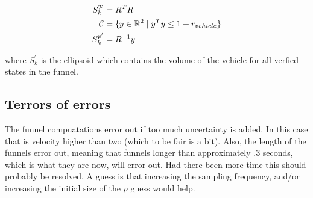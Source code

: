 \begin{align*}
  S_{k}^{\mathcal{P}} &= R^{T}R \\
  \mathcal{C} &= \lbrace y \in \mathbb{R}^2 \mid y^{T}y \leq 1 + r_{vehicle}\rbrace \\
  S_{k}^{p'} &= R^{-1}y \\
\end{align*}

where \(S_{k}^{'}\) is the ellipsoid which contains the volume of the vehicle
for all verfied states in the funnel.

\subsection{Terrors of errors}

The funnel compuatations error out if too much uncertainty is added. In this
case that is velocity higher than two (which to be fair is a bit). Also, the
length of the funnels error out, meaning that funnels longer than approximately
.3 seconds, which is what they are now, will error out. Had there
been more time this should probably be resolved. A guess is that increasing the
sampling frequency, and/or increasing the initial size of the \(\rho\) guess
would help.